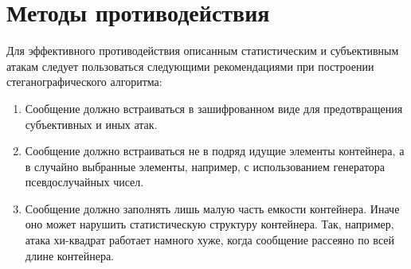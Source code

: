 \section{Методы противодействия}
Для эффективного противодействия описанным статистическим и субъективным
атакам следует пользоваться следующими рекомендациями при построении
стеганографического алгоритма:
\begin{enumerate}
    \item Сообщение должно встраиваться в зашифрованном виде для предотвращения
    субъективных и иных атак.
    \item Сообщение должно встраиваться не в подряд идущие элементы контейнера,
    а в случайно выбранные элементы, например, с использованием генератора псевдослучайных
    чисел.
    \item Сообщение должно заполнять лишь малую часть емкости контейнера. Иначе
    оно может нарушить статистическую структуру контейнера. Так, например,
    атака хи-квадрат работает намного хуже, когда сообщение рассеяно по всей длине контейнера.
\end{enumerate}